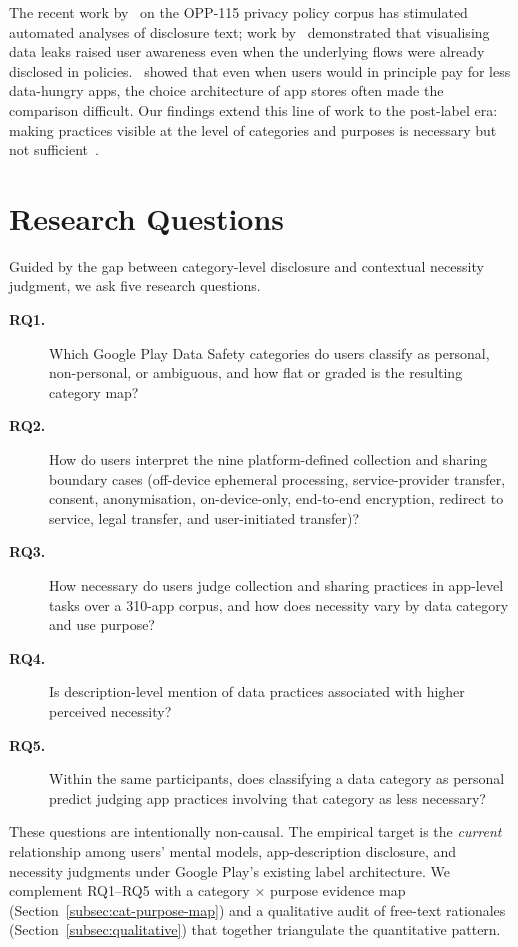 \documentclass[11pt,a4paper]{article}
\makeatletter
\let\@oldsection\section
\renewcommand{\section}{\FloatBarrier\@oldsection}
\makeatother
\begin{document}
The recent work by~\citet{wilson:etal:2016} on the OPP-115 privacy
policy corpus has stimulated automated analyses of disclosure text;
work by~\citet{balebako:etal:2014} demonstrated that visualising data
leaks raised user awareness even when the underlying flows were already
disclosed in policies.~\citet{egelman:etal:2013} showed that even when
users would in principle pay for less data-hungry apps, the choice
architecture of app stores often made the comparison difficult. Our
findings extend this line of work to the post-label era: making practices
visible at the level of categories and purposes is necessary but not
sufficient~\citep{cranor:2012}.

\section{Research Questions}
\label{sec:research-questions}

Guided by the gap between category-level disclosure and contextual
necessity judgment, we ask five research questions.

\begin{description}
    \item[\bfseries RQ1.] Which Google Play Data Safety categories do
    users classify as personal, non-personal, or ambiguous, and how flat
    or graded is the resulting category map?
    \item[\bfseries RQ2.] How do users interpret the nine
    platform-defined collection and sharing boundary cases (off-device
    ephemeral processing, service-provider transfer, consent,
    anonymisation, on-device-only, end-to-end encryption, redirect to
    service, legal transfer, and user-initiated transfer)?
    \item[\bfseries RQ3.] How necessary do users judge collection and
    sharing practices in app-level tasks over a 310-app corpus, and how
    does necessity vary by data category and use purpose?
    \item[\bfseries RQ4.] Is description-level mention of data practices
    associated with higher perceived necessity?
    \item[\bfseries RQ5.] Within the same participants, does classifying
    a data category as personal predict judging app practices involving
    that category as less necessary?
\end{description}

These questions are intentionally non-causal. The empirical target is the
\emph{current} relationship among users' mental models, app-description
disclosure, and necessity judgments under Google Play's existing label
architecture. We complement RQ1--RQ5 with a category $\times$ purpose
evidence map (Section~\ref{subsec:cat-purpose-map}) and a qualitative
audit of free-text rationales (Section~\ref{subsec:qualitative}) that
together triangulate the quantitative pattern.
\end{document}
